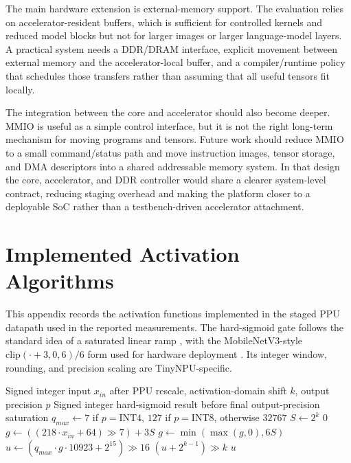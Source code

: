 \documentclass[a4paper, 12pt, titlepage]{article}
\begin{document}
The main hardware extension is external-memory support. The evaluation relies on accelerator-resident buffers, which is sufficient for controlled kernels and reduced model blocks but not for larger images or larger language-model layers. A practical system needs a DDR/DRAM interface, explicit movement between external memory and the accelerator-local buffer, and a compiler/runtime policy that schedules those transfers rather than assuming that all useful tensors fit locally.

The integration between the core and accelerator should also become deeper. MMIO is useful as a simple control interface, but it is not the right long-term mechanism for moving programs and tensors. Future work should reduce MMIO to a small command/status path and move instruction images, tensor storage, and DMA descriptors into a shared addressable memory system. In that design the core, accelerator, and DDR controller would share a clearer system-level contract, reducing staging overhead and making the platform closer to a deployable SoC rather than a testbench-driven accelerator attachment.

\appendix
\section{Implemented Activation Algorithms}
\label{app:activation-algorithms}

This appendix records the activation functions implemented in the staged PPU datapath used in the reported measurements. The hard-sigmoid gate follows the standard idea of a saturated linear ramp \cite{courbariaux2016binarized}, with the MobileNetV3-style \(\mathrm{clip}(\cdot+3,0,6)/6\) form used for hardware deployment \cite{howard2019mobilenetv3}. Its integer window, rounding, and precision scaling are TinyNPU-specific.

\begin{algorithm}[H]
\caption{TinyNPU Hard-Sigmoid Gate}
\begin{algorithmic}[1]
\Require Signed integer input $x_{in}$ after PPU rescale, activation-domain shift $k$, output precision $p$
\Ensure Signed integer hard-sigmoid result before final output-precision saturation
\State $q_{max} \gets 7$ if $p=\mathrm{INT4}$, $127$ if $p=\mathrm{INT8}$, otherwise $32767$
\State $S \gets 2^k$
    \State \Return $0$
\Else
    \State $g \gets ((218 \cdot x_{in} + 64) \gg 7) + 3S$
    \State $g \gets \min(\max(g, 0), 6S)$
    \State $u \gets (q_{max} \cdot g \cdot 10923 + 2^{15}) \gg 16$
        \State \Return $(u + 2^{k-1}) \gg k$
    \Else
        \State \Return $u$
    \EndIf
\EndIf
\end{algorithmic}
\end{algorithm}
\end{document}
